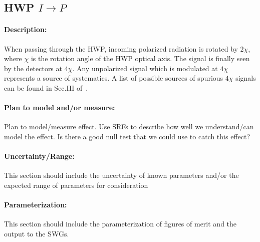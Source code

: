 \subsection{HWP $I\rightarrow P$}
\label{IP downstream of HWP}
\paragraph{Description:}
When passing through the HWP, incoming polarized radiation is rotated by $2\chi$, where $\chi$ is the rotation angle of the HWP optical axis. The signal is finally seen by the detectors at $4\chi$. Any unpolarized signal which is modulated at $4\chi$ represents a source of systematics. A list of possible sources of spurious $4\chi$ signals can be found in Sec.III of~\cite{ABS}.

\paragraph{Plan to model and/or measure:}
Plan to model/measure effect. Use SRFs to describe how well we understand/can model the effect. Is there a good null test that we could use to catch this effect?

\paragraph{Uncertainty/Range:}
This section should include the uncertainty of
known parameters and/or the expected range of parameters for consideration

\paragraph{Parameterization:}
This section should include the parameterization of figures of
merit and the output to the SWGs.

